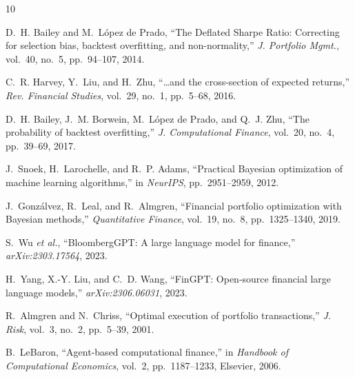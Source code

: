 \documentclass[conference]{IEEEtran}
\begin{document}
\begin{thebibliography}{10}

D.~H. Bailey and M.~L\'{o}pez de Prado, ``The Deflated Sharpe Ratio: Correcting for selection bias, backtest overfitting, and non-normality,'' \textit{J. Portfolio Mgmt.}, vol.~40, no.~5, pp.~94--107, 2014.

C.~R. Harvey, Y.~Liu, and H.~Zhu, ``\ldots and the cross-section of expected returns,'' \textit{Rev. Financial Studies}, vol.~29, no.~1, pp.~5--68, 2016.

D.~H. Bailey, J.~M. Borwein, M.~L\'{o}pez de Prado, and Q.~J. Zhu, ``The probability of backtest overfitting,'' \textit{J. Computational Finance}, vol.~20, no.~4, pp.~39--69, 2017.

J.~Snoek, H.~Larochelle, and R.~P. Adams, ``Practical Bayesian optimization of machine learning algorithms,'' in \textit{NeurIPS}, pp.~2951--2959, 2012.

J.~Gonz\'{a}lvez, R.~Leal, and R.~Almgren, ``Financial portfolio optimization with Bayesian methods,'' \textit{Quantitative Finance}, vol.~19, no.~8, pp.~1325--1340, 2019.

S.~Wu \textit{et al.}, ``BloombergGPT: A large language model for finance,'' \textit{arXiv:2303.17564}, 2023.

H.~Yang, X.-Y. Liu, and C.~D. Wang, ``FinGPT: Open-source financial large language models,'' \textit{arXiv:2306.06031}, 2023.

R.~Almgren and N.~Chriss, ``Optimal execution of portfolio transactions,'' \textit{J. Risk}, vol.~3, no.~2, pp.~5--39, 2001.

B.~LeBaron, ``Agent-based computational finance,'' in \textit{Handbook of Computational Economics}, vol.~2, pp.~1187--1233, Elsevier, 2006.

\end{thebibliography}
\end{document}
